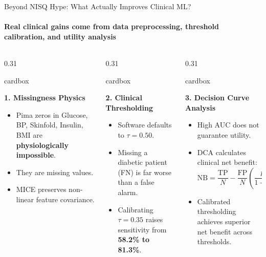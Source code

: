 \documentclass[aspectratio=169, 10pt]{beamer}
\newcommand{\cardbox}[3]{%
  \begin{beamercolorbox}[wd=\linewidth,rounded=true,sep=2.5pt]{cardbox}%
    {\bfseries\scriptsize\color{#1}#2\par}\vspace*{1pt}%
    {\footnotesize #3}%
  \end{beamercolorbox}%
}
\begin{document}
\begin{frame}{Beyond NISQ Hype: What Actually Improves Clinical ML?}
  \framesubtitle{Real clinical gains come from data preprocessing, threshold calibration, and utility analysis}

  \begin{columns}[T]
    \begin{column}{0.31\textwidth}
      \cardbox{DeepPurple}{1. Missingness Physics}{
        \begin{itemize}\setlength\itemsep{1pt}\scriptsize
          \item Pima zeros in Glucose, BP, Skinfold, Insulin, BMI are \textbf{physiologically impossible}.
          \item They are missing values.
          \item MICE preserves non-linear feature covariance.
        \end{itemize}
      }
    \end{column}

    \begin{column}{0.31\textwidth}
      \cardbox{TealAccent}{2. Clinical Thresholding}{
        \begin{itemize}\setlength\itemsep{1pt}\scriptsize
          \item Software defaults to $\tau = 0.50$.
          \item Missing a diabetic patient (FN) is far worse than a false alarm.
          \item Calibrating $\tau = 0.35$ raises sensitivity from \textbf{58.2\% to 81.3\%}.
        \end{itemize}
      }
    \end{column}

    \begin{column}{0.31\textwidth}
      \cardbox{MedPurple}{3. Decision Curve Analysis}{
        \begin{itemize}\setlength\itemsep{1pt}\scriptsize
          \item High AUC does not guarantee utility.
          \item DCA calculates clinical net benefit:
          \[
            \text{NB} = \frac{\text{TP}}{N} - \frac{\text{FP}}{N}\left(\frac{p_t}{1 - p_t}\right)
          \]
          \item Calibrated thresholding achieves superior net benefit across thresholds.
        \end{itemize}
      }
    \end{column}
  \end{columns}
\end{frame}
\end{document}
